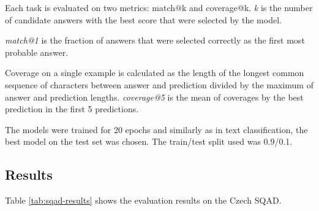 \documentclass[
  printed, %
  color,   %
  table,   %
  oneside, %
  lof,     %
  lot,     %
]{fithesis3}
\begin{document}
Each task is evaluated on two metrics: match@k and coverage@k. \textit{k} is the number of candidate answers with the best score that were selected by the model.

\textit{match@1} is the fraction of answers that were selected correctly as the first most probable answer.

Coverage on a single example is calculated as the length of the longest common sequence of characters between answer and prediction divided by the maximum of answer and prediction lengths. \textit{coverage@5} is the mean of coverages by the best prediction in the first 5 predictions.


The models were trained for 20 epochs and similarly as in text classification, the best model on the test set was chosen. The train/test split used was 0.9/0.1. 


\subsection{Results}

Table \ref{tab:sqad-results} shows the evaluation results on the Czech SQAD. 
\end{document}
